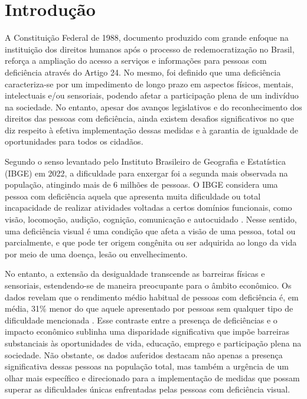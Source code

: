 \chapter{Introdução}
\label{cap:introducao}


A Constituição Federal de 1988, documento produzido com grande enfoque na instituição dos direitos humanos após o processo de redemocratização no Brasil, reforça a ampliação do acesso a serviços e informações para pessoas com deficiência através do Artigo 24. No mesmo, foi definido que uma deficiência caracteriza-se por um impedimento de longo prazo em aspectos físicos, mentais, intelectuais e/ou sensoriais, podendo afetar a participação plena de um indivíduo na sociedade. No entanto, apesar dos avanços legislativos e do reconhecimento dos direitos das pessoas com deficiência, ainda existem desafios significativos no que diz respeito à efetiva implementação dessas medidas e à garantia de igualdade de oportunidades para todos os cidadãos.

Segundo o senso levantado pelo Instituto Brasileiro de Geografia e Estatística (IBGE) em 2022, a dificuldade para enxergar foi a segunda mais observada na população, atingindo mais de 6 milhões de pessoas. O IBGE considera uma pessoa com deficiência aquela que apresenta muita dificuldade ou total incapacidade de realizar atividades voltadas a certos domínios funcionais, como visão, locomoção, audição, cognição, comunicação e autocuidado   \cite{ibge}. Nesse sentido, uma deficiência visual é uma condição que afeta a visão de uma pessoa, total ou parcialmente, e que pode ter origem congênita ou ser adquirida ao longo da vida por meio de uma doença, lesão ou envelhecimento.

No entanto, a extensão da desigualdade transcende as barreiras físicas e sensoriais, estendendo-se de maneira preocupante para o âmbito econômico. Os dados revelam que o rendimento médio habitual de pessoas com deficiência é, em média, 31\% menor do que aquele apresentado por pessoas sem qualquer tipo de dificuldade mencionada \cite{ibge}. Esse contraste entre a presença de deficiências e o impacto econômico sublinha uma disparidade significativa que impõe barreiras substanciais às oportunidades de vida, educação, emprego e participação plena na sociedade. Não obstante, os dados auferidos destacam não apenas a presença significativa dessas pessoas na população total, mas também a urgência de um olhar mais específico e direcionado para a implementação de medidas que possam superar as dificuldades únicas enfrentadas pelas pessoas com deficiência visual.

